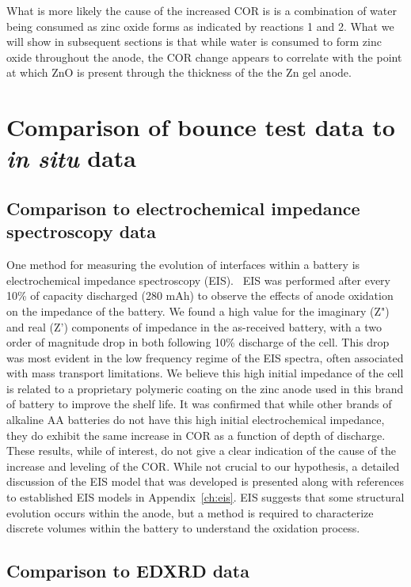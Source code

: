 {What is more likely the cause of the increased COR is is a combination of water being consumed as zinc oxide forms as indicated by reactions 1 and 2.  What we will show in subsequent sections is that while water is consumed to form zinc oxide throughout the anode, the COR change appears to correlate with the point at which ZnO is present through the thickness of the the Zn gel anode.

\section{Comparison of bounce test data to \textit{in situ} data}

\subsection{Comparison to electrochemical impedance spectroscopy data}

One method for measuring the evolution of interfaces within a battery is electrochemical impedance spectroscopy (EIS).~\cite{dornbusch,ghavami} EIS was performed after every 10\% of capacity discharged (280 mAh) to observe the effects of anode oxidation on the impedance of the battery. We found a high value for the imaginary (Z") and  real (Z') components of impedance in the as-received battery, with a two order of magnitude drop in both following 10\% discharge of the cell. This drop was most evident in the low frequency regime of the EIS spectra, often associated with mass transport limitations. We believe this high initial impedance of the cell is related to a proprietary polymeric coating on the zinc anode used in this brand of battery to improve the shelf life.  It was confirmed that while other brands of alkaline AA batteries do not have this high initial electrochemical impedance, they do exhibit the same increase in COR as a function of depth of discharge. These results, while of interest, do not give a clear indication of the cause of the increase and leveling of the COR. While not crucial to our hypothesis, a detailed discussion of the EIS model that was developed is presented along with references to established EIS models in Appendix~\ref{ch:eis}. EIS suggests that some structural evolution occurs within the anode, but a method is required to characterize discrete volumes within the battery to understand the oxidation process.  

\subsection{Comparison to EDXRD data}

}
